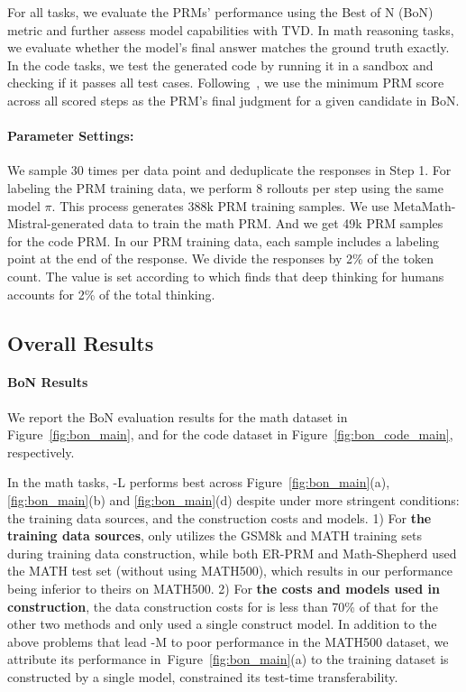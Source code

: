 For all tasks, we evaluate the PRMs' performance using the Best of N (BoN) metric and further assess model capabilities with TVD. In math reasoning tasks, we evaluate whether the model's final answer matches the ground truth exactly. In the code tasks, we test the generated code by running it in a sandbox and checking if it passes all test cases. Following~\citet{wang2024mathshepherdverifyreinforcellms}, we use the minimum PRM score across all scored steps as the PRM's final judgment for a given candidate in BoN.


\paragraph{Parameter Settings:} We sample 30 times per data point and deduplicate the responses in Step 1. For labeling the PRM training data, we perform 8 rollouts per step using the same model $\pi$. This process generates 388k PRM training samples. We use MetaMath-Mistral-generated data to train the math PRM. And we get 49k PRM samples for the code PRM. In our PRM training data, each sample includes a labeling point at the end of the response. We divide the responses by 2\% of the token count.
The value is set according to \citet{kahneman2011thinking} which finds that deep thinking for humans accounts for 2\% of the total thinking.






\subsection{Overall Results} 

\paragraph{BoN Results} We report the BoN evaluation results for the math dataset in Figure~\ref{fig:bon_main}, and for the code dataset in Figure~\ref{fig:bon_code_main}, respectively.

In the math tasks, \MethodName-L \hspace{1pt} performs best across Figure~\ref{fig:bon_main}(a), \ref{fig:bon_main}(b) and \ref{fig:bon_main}(d) despite under more stringent conditions: the training data sources, and the construction costs and models. 1) For \textbf{the training data sources}, \MethodName\hspace{1pt} only utilizes the GSM8k and MATH training sets during training data construction, while both ER-PRM and Math-Shepherd used the MATH test set (without using MATH500), which results in our performance being inferior to theirs on MATH500. 2) For \textbf{the costs and models used in construction}, the data construction costs for \MethodName\hspace{1pt} is less than 70\% of that for the other two methods and only used a single construct model. In addition to the above problems that lead \MethodName-M \hspace{1pt} to poor performance in the MATH500 dataset,  we attribute its performance in~Figure~\ref{fig:bon_main}(a) to the training dataset is constructed by a single model, constrained its test-time transferability.


